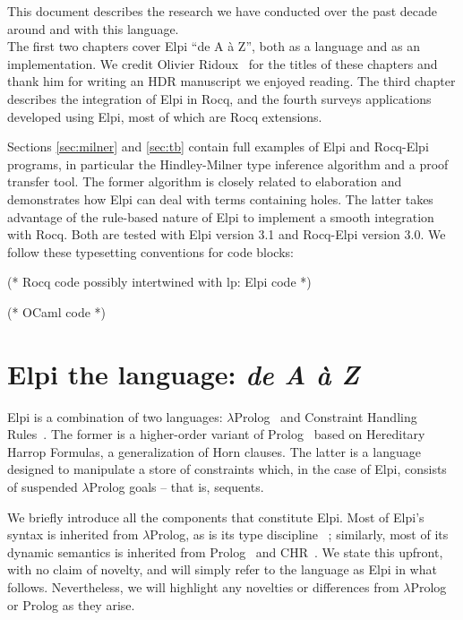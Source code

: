 \documentclass{these-ISSS}
\newenvironment{elpicode}
  {\VerbatimEnvironment\begin{elpibox}\begin{xelpicode}}{\end{xelpicode}
\end{elpibox}}
\newenvironment{rocqcode}
  {\VerbatimEnvironment\begin{rocqbox}\begin{xrocqcode}}{\end{xrocqcode}
\end{rocqbox}}
\newenvironment{ocamlcode}
  {\VerbatimEnvironment\begin{ocamlbox}\begin{xocamlcode}}{\end{xocamlcode}
\end{ocamlbox}}
\begin{document}
This document describes the research we have conducted over the past decade
around and with this language.\\

The first two chapters cover Elpi ``de A \`a Z'', both as a language and as an
implementation. We credit Olivier Ridoux~\cite{ridoux1998lambda} for the titles of
these chapters and thank him for writing an HDR manuscript we enjoyed reading.
The third chapter describes the integration of Elpi in Rocq, and the fourth
surveys applications developed using Elpi, most of which are Rocq extensions.

Sections \ref{sec:milner} and \ref{sec:tb} contain full examples of Elpi and
Rocq-Elpi programs, in particular the Hindley-Milner type inference
algorithm and a proof transfer tool. The former algorithm is closely related
to elaboration and demonstrates how Elpi can deal with terms containing holes.
The latter takes advantage of the rule-based nature of Elpi to implement a
smooth integration with Rocq.
Both are tested with Elpi version 3.1 and Rocq-Elpi version 3.0.
We follow these typesetting conventions for code blocks:

\begin{elpicode}
%
%
\end{elpicode}
\begin{rocqcode}
(*
  Rocq code possibly intertwined with   lp:{{ Elpi code }}
*)
\end{rocqcode}
\begin{ocamlcode}
(* 
   OCaml code
*)
\end{ocamlcode}

\chapter{Elpi the language: \emph{de A \`a Z}}


Elpi is a combination of two languages: $\lambda$Prolog~\cite{10.1093/logcom/1.4.497,Miller_Nadathur_2012}
and Constraint Handling Rules~\cite{FRUHWIRTH199895,chr}. The former is a
higher-order variant of Prolog~\cite{prolog0,prolog} based on Hereditary
Harrop Formulas, a generalization of Horn clauses. The latter is a language
designed to manipulate a store of constraints which, in the case of Elpi,
consists of suspended $\lambda$Prolog goals -- that is, sequents.

We briefly introduce all the components that constitute Elpi. Most of Elpi's
syntax is inherited from $\lambda$Prolog, as is its type discipline
~\cite{Miller_Nadathur_2012}; similarly, most of its dynamic semantics is
inherited from Prolog~\cite{1989Vink} and CHR~\cite{10.1007/978-3-540-27775-0_7}.
We state this upfront, with no claim of novelty, and
will simply refer to the language as Elpi in what follows. Nevertheless, we
will highlight any novelties or differences from $\lambda$Prolog or Prolog as
they arise.
\end{document}
